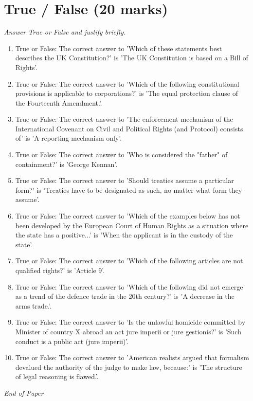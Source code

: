 \documentclass[12pt]{article}
\begin{document}
\section*{True / False (20 marks)}
\textit{Answer True or False and justify briefly.}
\begin{enumerate}[label=\arabic*.]
\item True or False: The correct answer to 'Which of these statements best describes the UK Constitution?' is 'The UK Constitution is based on a Bill of Rights'.
\item True or False: The correct answer to 'Which of the following constitutional provisions is applicable to corporations?' is 'The equal protection clause of the Fourteenth Amendment.'.
\item True or False: The correct answer to 'The enforcement mechanism of the International Covenant on Civil and Political Rights (and Protocol) consists of' is 'A reporting mechanism only'.
\item True or False: The correct answer to 'Who is considered the "father" of containment?' is 'George Kennan'.
\item True or False: The correct answer to 'Should treaties assume a particular form?' is 'Treaties have to be designated as such, no matter what form they assume'.
\item True or False: The correct answer to 'Which of the examples below has not been developed by the European Court of Human Rights as a situation where the state has a positive...' is 'When the applicant is in the custody of the state'.
\item True or False: The correct answer to 'Which of the following articles are not qualified rights?' is 'Article 9'.
\item True or False: The correct answer to 'Which of the following did not emerge as a trend of the defence trade in the 20th century?' is 'A decrease in the arms trade.'.
\item True or False: The correct answer to 'Is the unlawful homicide committed by Minister of country X abroad an act jure imperii or jure gestionis?' is 'Such conduct is a public act (jure imperii)'.
\item True or False: The correct answer to 'American realists argued that formalism devalued the authority of the judge to make law, because:' is 'The structure of legal reasoning is flawed.'.
\end{enumerate}

\vfill
\noindent\textit{End of Paper}
\end{document}
